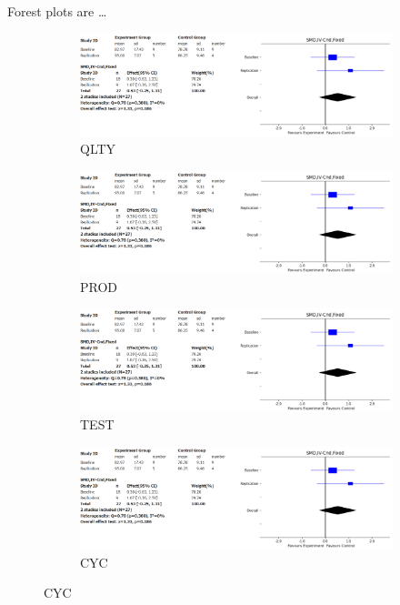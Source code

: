 Forest plots are \dots
\begin{figure}[htbp]
    \centering
    \begin{subfigure}{0.5\textwidth}
        \includegraphics[width=\linewidth]{figures/forest_plots/QLTY.png}
        \caption{QLTY}
        \label{bp_task1_qlty}
    \end{subfigure}\hfil
    \begin{subfigure}{0.5\textwidth}
        \includegraphics[width=\linewidth]{figures/forest_plots/QLTY.png}
        \caption{PROD}
        \label{bp_task1_prod}
    \end{subfigure}

    \medskip

    \begin{subfigure}{0.5\textwidth}
        \includegraphics[width=\linewidth]{figures/forest_plots/QLTY.png}
        \caption{TEST}
        \label{bp_task1_test}
    \end{subfigure}\hfil
    \begin{subfigure}{0.5\textwidth}
        \includegraphics[width=\linewidth]{figures/forest_plots/QLTY.png}
        \caption{CYC}
        \label{bp_task1_cyc}
    \end{subfigure}


\end{figure}

